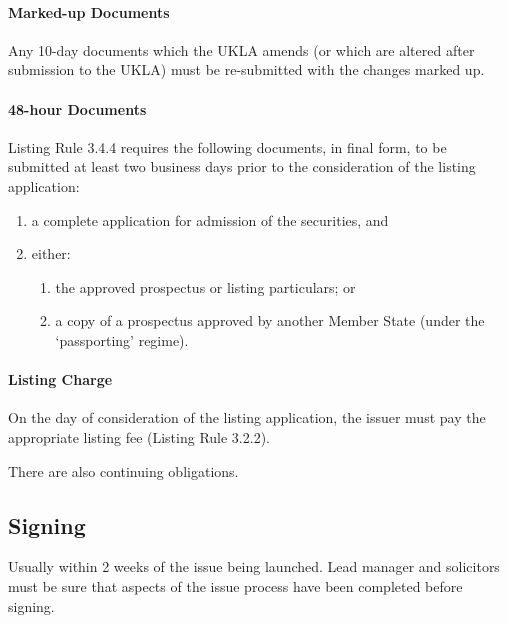 \documentclass[
]{article}
\providecommand{\tightlist}{%
  \setlength{\itemsep}{0pt}\setlength{\parskip}{0pt}}
\begin{document}
\hypertarget{marked-up-documents}{%
\paragraph{Marked-up Documents}\label{marked-up-documents}}

Any 10-day documents which the UKLA amends (or which are altered after
submission to the UKLA) must be re-submitted with the changes marked up.

\hypertarget{hour-documents}{%
\paragraph{48-hour Documents}\label{hour-documents}}

Listing Rule 3.4.4 requires the following documents, in final form, to
be submitted at least two business days prior to the consideration of
the listing application:

\begin{enumerate}
\tightlist
\item
  a complete application for admission of the securities, and
\item
  either:

  \begin{enumerate}
  \tightlist
  \item
    the approved prospectus or listing particulars; or
  \item
    a copy of a prospectus approved by another Member State (under the
    `passporting' regime).
  \end{enumerate}
\end{enumerate}

\hypertarget{listing-charge}{%
\paragraph{Listing Charge}\label{listing-charge}}

On the day of consideration of the listing application, the issuer must
pay the appropriate listing fee (Listing Rule 3.2.2).

There are also continuing obligations.

\hypertarget{signing}{%
\subsection{Signing}\label{signing}}

Usually within 2 weeks of the issue being launched. Lead manager and
solicitors must be sure that aspects of the issue process have been
completed before signing.
\end{document}
